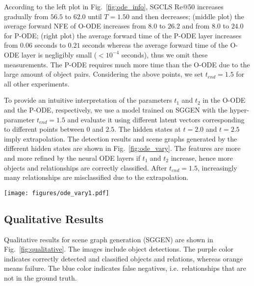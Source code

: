 \documentclass[runningheads]{llncs}
\begin{document}
According to the left plot in Fig.~\ref{fig:ode_info}, SGCLS Re@50 increases gradually from $56.5$ to $62.0$ until $T=1.50$ and then decreases; (middle plot) the average forward NFE of O-ODE increases from $8.0$ to $26.2$ and from $8.0$ to $24.0$ for P-ODE; (right plot) the average forward time of the P-ODE layer increases from $0.06$ seconds to $0.21$ seconds whereas the average forward time of the O-ODE layer is negligibly small ($<10^{-4}$ seconds), thus we omit these measurements. The P-ODE requires much more time than the O-ODE due to the large amount of object pairs. Considering the above points, we set $t_{end}=1.5$ for all other experiments.


To provide an intuitive interpretation of the parameters $t_1$ and $t_2$ in the O-ODE and the P-ODE, respectively, we use a model trained on SGGEN with the hyper-parameter $t_{end}=1.5$ and evaluate it using different latent vectors corresponding to different points between $0$ and $2.5$. 
The hidden states at $t=2.0$ and $t=2.5$ imply extrapolation. The detection results and scene graphs generated by the different hidden states are shown in Fig.~\ref{fig:ode_vary}. The features are more and more refined by the neural ODE layers if $t_1$ and $t_2$ increase, hence more objects and relationships are correctly classified. After $t_{end}=1.5$, increasingly many relationships are misclassified due to the extrapolation.

\begin{figure*}[!ht]
    \centering
    \texttt{[image: figures/ode\_vary1.pdf]}
    \caption{We evaluate the model trained with the hyper-parameter $t_{end}=1.5$, i.e.~during training the hidden vector at $t=1.5$ is used for classifications. The upper row visualizes detection results while the lower row shows the corresponding scene graphs. The red box indicates the state corresponding to $t=1.5$. \newline
    The orange boxes and edges indicate the objects and predicates in the ground truth that are not detected, purple that the objects and predicates are predicted correctly. Blue edges show false positives.}
\label{fig:ode_vary}
\end{figure*}


\subsection{Qualitative Results}
\label{subsec:qualitative}

Qualitative results for scene graph generation (SGGEN) are shown in Fig.~\ref{fig:qualitative}. The images include object detections. The purple color indicates correctly detected and classified objects and relations, whereas orange means failure. The blue color indicates false negatives, i.e.~relationships that are not in the ground truth. 
\end{document}
